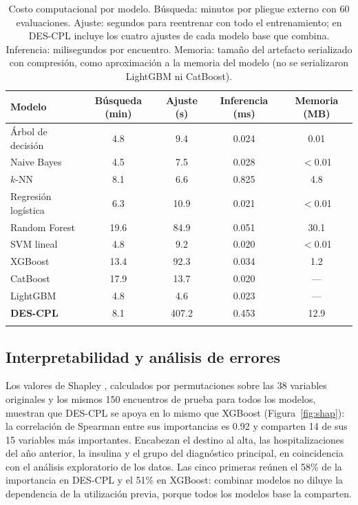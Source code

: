 \documentclass[pdflatex,sn-mathphys-num]{sn-jnl}
\theoremstyle{plain}
\begin{document}
\begin{table}[h]
\caption{Costo computacional por modelo. Búsqueda: minutos por pliegue externo con 60 evaluaciones. Ajuste: segundos para reentrenar con todo el entrenamiento; en DES-CPL incluye los cuatro ajustes de cada modelo base que combina. Inferencia: milisegundos por encuentro. Memoria: tamaño del artefacto serializado con compresión, como aproximación a la memoria del modelo (no se serializaron LightGBM ni CatBoost).}\label{tab:costo}
\begin{tabular}{@{}lcccc@{}}
\toprule
Modelo & Búsqueda (min) & Ajuste (s) & Inferencia (ms) & Memoria (MB) \\
\midrule
Árbol de decisión & 4.8 & 9.4 & 0.024 & 0.01 \\
Naive Bayes & 4.5 & 7.5 & 0.028 & $<$0.01 \\
$k$-NN & 8.1 & 6.6 & 0.825 & 4.8 \\
Regresión logística & 6.3 & 10.9 & 0.021 & $<$0.01 \\
Random Forest & 19.6 & 84.9 & 0.051 & 30.1 \\
SVM lineal & 4.8 & 9.2 & 0.020 & $<$0.01 \\
XGBoost & 13.4 & 92.3 & 0.034 & 1.2 \\
CatBoost & 17.9 & 13.7 & 0.020 & --- \\
LightGBM & 4.8 & 4.6 & 0.023 & --- \\
\textbf{DES-CPL} & 8.1 & 407.2 & 0.453 & 12.9 \\
\botrule
\end{tabular}
\end{table}

\subsection{Interpretabilidad y análisis de errores}\label{subsec:interpretabilidad}

Los valores de Shapley \cite{bib_lundberg}, calculados por permutaciones sobre las 38 variables originales y los mismos 150 encuentros de prueba para todos los modelos, muestran que DES-CPL se apoya en lo mismo que XGBoost (Figura~\ref{fig:shap}): la correlación de Spearman entre sus importancias es 0.92 y comparten 14 de sus 15 variables más importantes. Encabezan el destino al alta, las hospitalizaciones del año anterior, la insulina y el grupo del diagnóstico principal, en coincidencia con el análisis exploratorio de los datos. Las cinco primeras reúnen el 58\% de la importancia en DES-CPL y el 51\% en XGBoost: combinar modelos no diluye la dependencia de la utilización previa, porque todos los modelos base la comparten.
\end{document}
